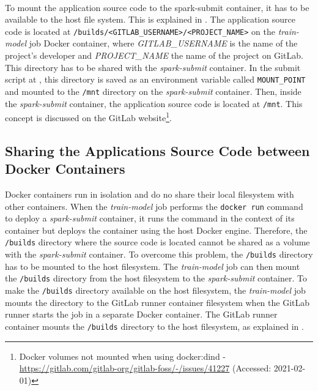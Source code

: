 \paragraph{}
To mount the application source code to the spark-submit container, it has to be available to the host file system. This is explained in .
The application source code is located at \texttt{/builds/<GITLAB\_USERNAME>/<PROJECT\_NAME>} on the \textit{train-model} job Docker container, where \textit{GITLAB\_USERNAME} is the name of the project's developer and \textit{PROJECT\_NAME} the name of the project on GitLab. This directory has to be shared with the \textit{spark-submit} container.
%
In the submit script at , this directory is saved as an environment variable called \texttt{MOUNT\_POINT} and mounted to the \texttt{/mnt} directory on the \textit{spark-submit} container. Then, inside the \textit{spark-submit} container, the application source code is located at \texttt{/mnt}.
%
This concept is discussed on the GitLab website\footnote{Docker volumes not mounted when using docker:dind - \url{https://gitlab.com/gitlab-org/gitlab-foss/-/issues/41227} (Accessed: 2021-02-01)}.


\subsection{Sharing the Applications Source Code between Docker Containers}
\label{subsec:06_pipeline_share}
Docker containers run in isolation and do no share their local filesystem with other containers.
% 
When the \textit{train-model} job performs the \texttt{docker run} command to deploy a \textit{spark-submit} container, it runs the command in the context of its container but deploys the container using the host Docker engine. Therefore, the \texttt{/builds} directory where the source code is located cannot be shared as a volume with the \textit{spark-submit} container.
% 
To overcome this problem, the \texttt{/builds} directory has to be mounted to the host filesystem. The \textit{train-model} job can then mount the \texttt{/builds} directory from the host filesystem to the \textit{spark-submit} container.
%
To make the \texttt{/builds} directory available on the host filesystem, the \textit{train-model} job mounts the directory to the GitLab runner container filesystem when the GitLab runner starts the job in a separate Docker container. The GitLab runner container mounts the \texttt{/builds}  directory to the host filesystem, as explained in .
